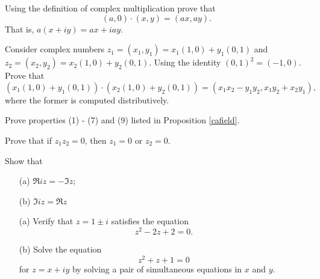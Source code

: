 \begin{problem}\label{prob 1.1}
Using the definition of complex multiplication prove that
\[(a,0)\cdot (x,y) = (ax,ay).\]
That is, $a(x + iy) = ax + iay$.
\end{problem}

\vspace*{0.1in}

\begin{problem}\label{prob 1.2}
Consider complex numbers $z_1 = (x_1,y_1) = x_1(1,0) + y_1(0,1)$ and $z_2 = (x_2,y_2) = x_2(1,0) + y_2(0,1)$. Using the identity $(0,1)^2 = (-1,0)$. Prove that \[(x_1(1,0) + y_1(0,1))\cdot (x_2(1,0) + y_2(0,1)) = (x_1x_2 - y_1y_2, x_1y_2 + x_2y_1),\] where the former is computed distributively.
\end{problem}

\newpage

\begin{problem}\label{prob 1.3}
Prove properties (1) - (7) and (9) listed in Proposition \ref{cafield}.
\end{problem}

\vspace*{0.1in}

\begin{problem}\label{prob 1.3a}
Prove that if $z_1z_2 = 0$, then $z_1 = 0$ or $z_2 = 0$.
\end{problem}

\vspace*{0.1in}

\begin{problem}\label{prob 1.4}
Show that
\begin{itemize}
\item[(a)] $\Re iz = - \Im z$;
\item[(b)] $\Im iz = \Re z$
\end{itemize}
\end{problem}

\vspace*{0.1in}

\begin{problem}\label{prob 1.5}\hfill
\begin{itemize}
\item[(a)] Verify that $z = 1 \pm i$ satisfies the equation \[z^2 - 2z + 2 = 0.\]
\item[(b)] Solve the equation \[z^2 + z + 1 = 0\] for $z = x + iy$ by solving a pair of simultaneous equations in $x$ and $y$.
\end{itemize}
\end{problem}

